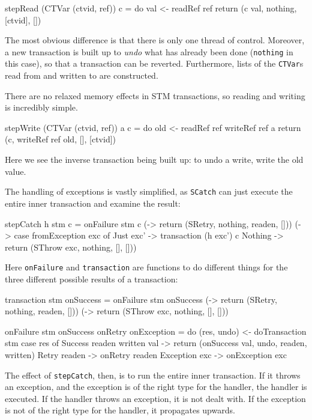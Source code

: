 \begin{haskellcode}
stepRead (CTVar (ctvid, ref)) c = do
  val <- readRef ref
  return (c val, nothing, [ctvid], [])
\end{haskellcode}

The most obvious difference is that there is only one thread of
control. Moreover, a new transaction is built up to \emph{undo} what
has already been done (\verb|nothing| in this case), so that a
transaction can be reverted. Furthermore, lists of the \verb|CTVar|s
read from and written to are constructed.

There are no relaxed memory effects in STM transactions, so reading
and writing is incredibly simple.

\begin{haskellcode}
stepWrite (CTVar (ctvid, ref)) a c = do
  old <- readRef ref
  writeRef ref a
  return (c, writeRef ref old, [], [ctvid])
\end{haskellcode}

Here we see the inverse transaction being built up: to undo a write,
write the old value.

The handling of exceptions is vastly simplified, as \verb|SCatch| can
just execute the entire inner transaction and examine the result:

\begin{haskellcode}
stepCatch h stm c = onFailure stm c
  (\readen -> return (SRetry, nothing, readen, []))
  (\exc    -> case fromException exc of
    Just exc' -> transaction (h exc') c
    Nothing   -> return (SThrow exc, nothing, [], []))
\end{haskellcode}

Here \verb|onFailure| and \verb|transaction| are functions to do
different things for the three different possible results of a
transaction:

\begin{haskellcode}
transaction stm onSuccess = onFailure stm onSuccess
  (\readen -> return (SRetry, nothing, readen, []))
  (\exc    -> return (SThrow exc, nothing, [], []))

onFailure stm onSuccess onRetry onException = do
  (res, undo) <- doTransaction stm
  case res of
    Success readen written val -> return (onSuccess val, undo, readen, written)
    Retry readen  -> onRetry readen
    Exception exc -> onException exc
\end{haskellcode}

The effect of \verb|stepCatch|, then, is to run the entire inner
transaction. If it throws an exception, and the exception is of the
right type for the handler, the handler is executed. If the handler
throws an exception, it is not dealt with. If the exception is not of
the right type for the handler, it propagates upwards.

